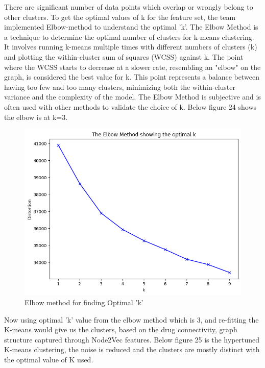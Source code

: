 \documentclass[journal,transmag]{J-NaNA}
\begin{document}
There are significant number of data points which overlap or wrongly belong to other clusters. To get the optimal values of k for the feature set, the team implemented Elbow-method to understand the optimal 'k'. The Elbow Method is a technique to determine the optimal number of clusters for k-means clustering. It involves running k-means multiple times with different numbers of clusters (k) and plotting the within-cluster sum of squares (WCSS) against k. The point where the WCSS starts to decrease at a slower rate, resembling an "elbow" on the graph, is considered the best value for k. This point represents a balance between having too few and too many clusters, minimizing both the within-cluster variance and the complexity of the model. The Elbow Method is subjective and is often used with other methods to validate the choice of k. Below figure 24 shows the elbow is at k=3.
\begin{figure}[htbp]
\centering
\includegraphics[width=\linewidth]{elbow_for_kmeans.png} 
\caption{Elbow method for finding Optimal 'k'} 
\label{fig: Elbow method for K-means} %
\end{figure}
Now using optimal 'k' value from the elbow method which is 3, and re-fitting the K-means would give us the clusters, based on the drug connectivity, graph structure captured through Node2Vec features. Below figure 25 is the hypertuned K-means clustering, the noise is reduced and the clusters are mostly distinct with the optimal value of K used. 
\end{document}
